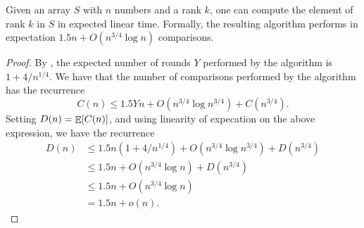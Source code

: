 \begin{theorem}
    Given an array $S$ with $n$ numbers and a rank $k$, one can compute
    the element of rank $k$ in $S$ in expected linear time.
    Formally, the resulting algorithm performs in expectation
    $1.5 n + O( n^{3/4} \log n)$ comparisons.
\end{theorem}
\begin{proof}
    By ,  the expected number of rounds $Y$ performed by the algorithm is $1 + 4/n^{1/4}$. We have that the number of comparisons performed by the algorithm has the recurrence
    \begin{equation*}
        C(n) \leq 1.5Yn + O(n^{3/4} \log n^{3/4}) + C(n^{3/4}).
    \end{equation*}
    Setting $D(n) = \mathop{\mathbb{E}}\!\left[ {C(n)} \right]$, and using linearity of expecation on the
    above expression, we have the recurrence
    \begin{align*}
        D(n)
        &\leq
        1.5n(1+4/n^{1/4}) + O(n^{3/4} \log n^{3/4}) + D(n^{3/4})
        \\&
        \leq
        1.5n + O(n^{3/4} \log n) + D(n^{3/4} )
        \\&%
        \leq
        1.5n + O(n^{3/4}\log n )
        \tag{by easy but tedious induction}%
        \\&
        =%
        1.5n + o(n).
    \end{align*}
\end{proof}









\ChapterEnd{}




